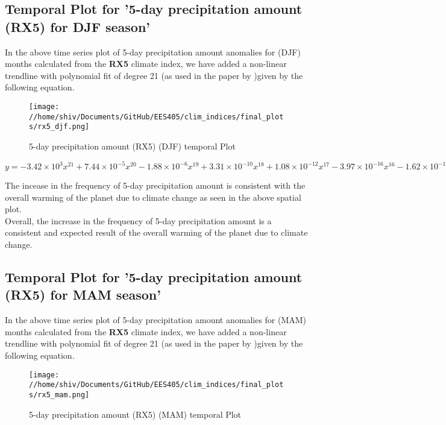 \documentclass[a4paper, 12pt, twoside]{report}
\begin{document}
\subsection{Temporal Plot for '5-day precipitation amount (RX5) for DJF season'}
In the above time series plot of 5-day precipitation amount anomalies for (DJF) months calculated from the \textbf{RX5} climate index, we have added a non-linear trendline with polynomial fit of degree 21 (as used in the paper by )given by the following equation.
\begin{figure}[htb]
    \centering
    \texttt{[image: //home/shiv/Documents/GitHub/EES405/clim\_indices/final\_plots/rx5\_djf.png]}
    \caption{5-day precipitation amount (RX5) (DJF) temporal Plot}
    \label{fig:rx5_djf_temporal}
\end{figure}

$ y = -3.42\times10^{3}x^{21}+7.44\times10^{-5}x^{20}-1.88\times10^{-6}x^{19}+3.31\times10^{-10}x^{18}+1.08\times10^{-12}x^{17}-3.97\times10^{-16}x^{16}-1.62\times10^{-19}x^{15}+1.05\times10^{-22}x^{14}-5.80\times10^{-27}x^{13}-8.00\times10^{-30}x^{12}+2.29\times10^{-33}x^{11}-1.20\times10^{-37}x^{10}-6.72\times10^{-41}x^{9}+1.99\times10^{-44}x^{8}-2.95\times10^{-48}x^{7}+2.85\times10^{-52}x^{6}-1.92\times10^{-56}x^{5}+9.12\times10^{-61}x^{4}-3.03\times10^{-65}x^{3}+6.69\times10^{-70}x^{2}-8.87\times10^{-75}x+5.34\times10^{-80}$

The incease in the frequency of 5-day precipitation amount is consistent with the overall warming of the planet due to climate change as seen in the above spatial plot.\\
Overall, the increase in the frequency of 5-day precipitation amount is a consistent and expected result of the overall warming of the planet due to climate change.
\newpage

\subsection{Temporal Plot for '5-day precipitation amount (RX5) for MAM season'}
In the above time series plot of 5-day precipitation amount anomalies for (MAM) months calculated from the \textbf{RX5} climate index, we have added a non-linear trendline with polynomial fit of degree 21 (as used in the paper by )given by the following equation.
\begin{figure}[htb]
    \centering
    \texttt{[image: //home/shiv/Documents/GitHub/EES405/clim\_indices/final\_plots/rx5\_mam.png]}
    \caption{5-day precipitation amount (RX5) (MAM) temporal Plot}
    \label{fig:rx5_mam_temporal}
\end{figure}
\end{document}
